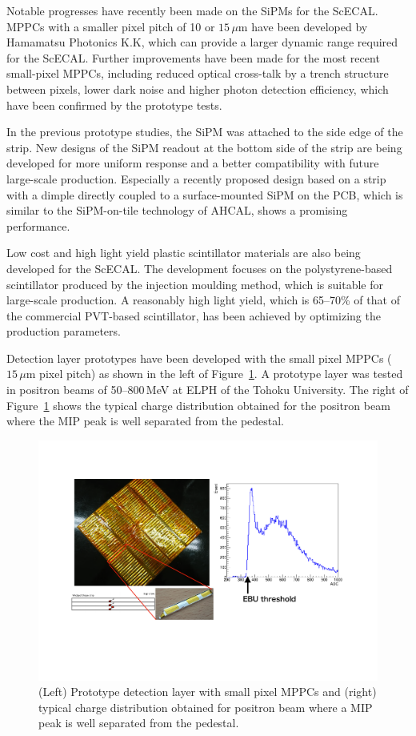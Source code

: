 Notable progresses have recently been made on the SiPMs for the ScECAL. 
MPPCs with a smaller pixel pitch of 10 or $15\,\mu\mathrm{m}$ have been developed 
by Hamamatsu Photonics K.K, which can provide a larger dynamic range required 
for the ScECAL\cite{ild:bib:hdmppc}. 
Further improvements have been made for the most recent small-pixel MPPCs, 
including reduced optical cross-talk by a trench structure between pixels, 
lower dark noise and higher photon detection efficiency, which have been confirmed by the prototype tests.

In the previous prototype studies, the SiPM was attached to the side edge 
of the strip. 
New designs of the SiPM readout at the bottom side of the strip 
are being developed for more uniform response and a better compatibility 
with future large-scale production.
Especially a recently proposed design based on a strip 
with a dimple directly coupled to a surface-mounted SiPM on the PCB, 
which is similar to the SiPM-on-tile technology of AHCAL,
shows a promising performance.

Low cost and high light yield plastic scintillator materials are also being developed 
for the ScECAL.
The development focuses on the polystyrene-based scintillator 
produced by the injection moulding method, which is suitable 
for large-scale production. 
A reasonably high light yield, which is 65--70\% of that of 
the commercial PVT-based scintillator, has been achieved 
by optimizing the production parameters. 

Detection layer prototypes have been developed 
with the small pixel MPPCs ($15\,\mu\mathrm{m}$ pixel pitch) 
as shown in the left of Figure~\ref{fig:det:ScWECAL_prototype}.
A prototype layer was tested in positron beams of 50--800\,MeV 
at ELPH of the Tohoku University.
The right of Figure~\ref{fig:det:ScWECAL_prototype} shows the typical charge distribution 
obtained for the positron beam where the MIP peak is well separated 
from the pedestal.

\begin{figure}[htb]
\centering
\includegraphics[width=1.0\hsize]{Detector/fig/ScWECAL_prototype.pdf}
\caption{(Left) Prototype detection layer with small pixel MPPCs  
   and (right) typical charge distribution obtained for positron beam 
where a MIP peak is well separated from the pedestal.}
\label{fig:det:ScWECAL_prototype}
\end{figure}


